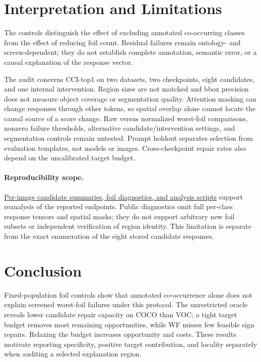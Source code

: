 \documentclass[10pt]{article}
\begin{document}
\section{Interpretation and Limitations}
The controls distinguish the effect of excluding annotated co-occurring
classes from the effect of reducing foil count. Residual failures remain ontology- and screen-dependent; they do not
establish complete annotation, semantic error, or a causal explanation of
the response vector.

The audit concerns CCI-top1 on two datasets, two checkpoints, eight candidates,
and one internal intervention. Region sizes are not matched and bbox precision
does not measure object coverage or segmentation quality. Attention masking
can change responses through other tokens, so spatial overlap alone cannot
locate the causal source of a score change. Raw versus normalized worst-foil
comparisons, nonzero failure thresholds, alternative candidate/intervention
settings, and segmentation controls remain untested. Prompt holdout separates
selection from evaluation templates, not models or images. Cross-checkpoint
repair rates also depend on the uncalibrated target budget.

\paragraph{Reproducibility scope.}
\href{https://github.com/jovial-liu/conway/tree/paper/verified-rerun-integration/experiments}{Per-image candidate summaries, foil diagnostics, and analysis scripts} support
reanalysis of the reported endpoints. Public diagnostics omit full per-class
response tensors and spatial masks; they do not support arbitrary new foil
subsets or independent verification of region identity. This limitation is
separate from the exact enumeration of the eight stored candidate responses.

\section{Conclusion}
Fixed-population foil controls show that annotated co-occurrence alone does
not explain screened worst-foil failures under this protocol. The unrestricted
oracle reveals lower candidate repair capacity on COCO than VOC; a tight
target budget removes most remaining opportunities, while WF misses few
feasible sign repairs. Relaxing the budget increases opportunity and costs.
These results motivate reporting specificity, positive target contribution,
and locality separately when auditing a selected explanation region.

\clearpage

\end{document}
